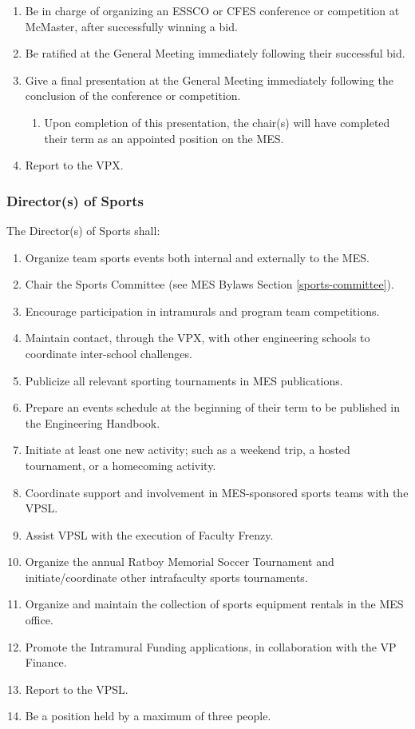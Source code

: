\begin{enumerate}
 \item
  Be in charge of organizing an ESSCO or CFES conference or competition at McMaster, after successfully winning a bid.
 \item
  Be ratified at the General Meeting immediately following their successful bid.
 \item
  Give a final presentation at the General Meeting immediately following the conclusion of the conference or competition.

  \begin{enumerate}
   \item
    Upon completion of this presentation, the chair(s) will have completed their term as an appointed position on the MES.
  \end{enumerate}
 \item
  Report to the VPX.

\end{enumerate}

\subsubsection{Director(s) of Sports}
\label{directors-of-sports}
The Director(s) of Sports shall:

\begin{enumerate}
 \item
  Organize team sports events both internal and externally to the MES.
 \item
  Chair the Sports Committee (see MES Bylaws Section \ref{sports-committee}).
 \item
  Encourage participation in intramurals and program team competitions.
 \item
  Maintain contact, through the VPX, with other engineering schools to coordinate inter-school challenges.
 \item
  Publicize all relevant sporting tournaments in MES publications.
 \item
  Prepare an events schedule at the beginning of their term to be published in the Engineering Handbook.
 \item
  Initiate at least one new activity; such as a weekend trip, a hosted tournament, or a homecoming activity.
 \item
  Coordinate support and involvement in MES-sponsored sports teams with the VPSL.
 \item
  Assist VPSL with the execution of Faculty Frenzy. 
 \item    
  Organize the annual Ratboy Memorial Soccer Tournament and initiate/coordinate other intrafaculty sports tournaments.
 \item
  Organize and maintain the collection of sports equipment rentals in the MES office.
 \item
  Promote the Intramural Funding applications, in collaboration with the VP Finance.
 \item
  Report to the VPSL.
 \item
  Be a position held by a maximum of three people.
\end{enumerate}

